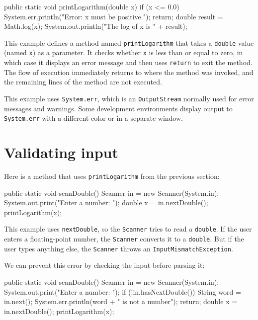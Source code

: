 \documentclass[12pt]{book}
\theoremstyle{exercise}
\newcommand{\java}[1]{\verb"#1"}
\begin{document}
\begin{code}
    public static void printLogarithm(double x) {
        if (x <= 0.0) {
            System.err.println("Error: x must be positive.");
            return;
        }
        double result = Math.log(x);
        System.out.println("The log of x is " + result);
    }
\end{code}

This example defines a method named \java{printLogarithm} that takes a \java{double} value (named \java{x}) as a parameter.
It checks whether \java{x} is less than or equal to zero, in which case it displays an error message and then uses \java{return} to exit the method.
The flow of execution immediately returns to where the method was invoked, and the remaining lines of the method are not executed.


This example uses \java{System.err}, which is an \java{OutputStream} normally used for error messages and warnings.
Some development environments display output to \java{System.err} with a different color or in a separate window.


\section{Validating input}

Here is a method that uses \java{printLogarithm} from the previous section:

\begin{code}
    public static void scanDouble() {
        Scanner in = new Scanner(System.in);
        System.out.print("Enter a number: ");
        double x = in.nextDouble();
        printLogarithm(x);
    }
\end{code}

This example uses \java{nextDouble}, so the \java{Scanner} tries to read a \java{double}.
If the user enters a floating-point number, the \java{Scanner} converts it to a \java{double}.
But if the user types anything else, the \java{Scanner} throws an \java{InputMismatchException}.


We can prevent this error by checking the input before parsing it:

\begin{code}
    public static void scanDouble() {
        Scanner in = new Scanner(System.in);
        System.out.print("Enter a number: ");
        if (!in.hasNextDouble()) {
            String word = in.next();
            System.err.println(word + " is not a number");
            return;
        }
        double x = in.nextDouble();
        printLogarithm(x);
    }
\end{code}
\end{document}
